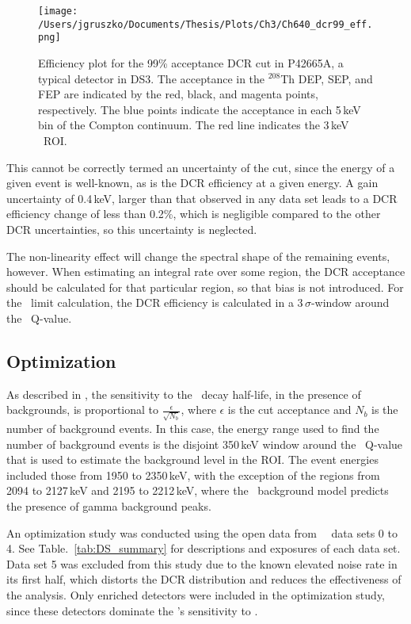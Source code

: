 \begin{figure}[t]
 \centering
 \texttt{[image: /Users/jgruszko/Documents/Thesis/Plots/Ch3/Ch640\_dcr99\_eff.png]}
 \caption[99\% acceptance DCR cut efficiency and uncertainties]{Efficiency plot for the 99\% acceptance DCR cut in P42665A, a typical detector in DS3. The acceptance in the $^{208}$Th DEP, SEP, and FEP are indicated by the red, black, and magenta points, respectively. The blue points indicate the acceptance in each 5\,keV bin of the Compton continuum. The red line indicates the 3\,keV \nonubb\ ROI.} 
 \label{fig:dcr99_eff}
\end{figure}

This cannot be correctly termed an uncertainty of the cut, since the energy of a given event is well-known, as is the DCR efficiency at a given energy. A gain uncertainty of 0.4\,keV, larger than that observed in any data set \cite{EnergyUnidoc} leads to a DCR efficiency change of less than 0.2\%, which is negligible compared to the other DCR uncertainties, so this uncertainty is neglected. 

The non-linearity effect will change the spectral shape of the remaining events, however. When estimating an integral rate over some region, the DCR acceptance should be calculated for that particular region, so that bias is not introduced. For the \nonubb\ limit calculation, the DCR efficiency is calculated in a 3\,$\sigma$-window around the \nonubb\ Q-value. 

\subsection{Optimization}
As described in \cite{Detwiler_sensitivity}, the sensitivity to the \nonubb\ decay half-life, in the presence of backgrounds, is proportional to $\frac{\epsilon}{\sqrt{N_b}}$, where $\epsilon$ is the cut acceptance and $N_b$ is the number of background events. In this case, the energy range used to find the number of background events is the disjoint 350\,keV window around the \nonubb\ Q-value that is used to estimate the background level in the ROI. The event energies included those from 1950 to 2350\,keV, with the exception of the regions from 2094 to 2127\,keV and 2195 to 2212\,keV, where the \MJ\ background model predicts the presence of gamma background peaks. 

An optimization study was conducted using the open data from \MJ\ \DEM\ data sets 0 to 4. See Table.~\ref{tab:DS_summary} for descriptions and exposures of each data set. Data set 5 was excluded from this study due to the known elevated noise rate in its first half, which distorts the DCR distribution and reduces the effectiveness of the analysis. Only enriched detectors were included in the optimization study, since these detectors dominate the \DEM 's sensitivity to \nonubb . 

